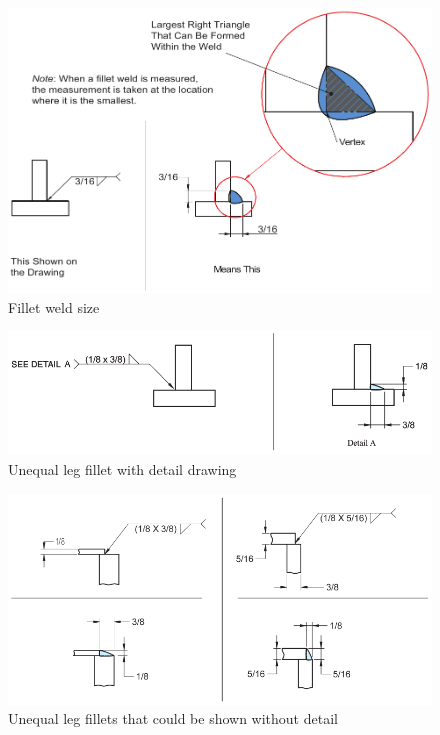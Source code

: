 \begin{figure}[H]
\centering
\includegraphics[width=.99\textwidth]{PIC/CH07/EXAMPLE/FWS}
\caption{Fillet weld size \citep{Corgan2017}}
\end{figure}
\begin{figure}[H]
\centering
\includegraphics{PIC/CH07/EXAMPLE/UL}
\caption{Unequal leg fillet with detail drawing \citep{Corgan2017}}
\end{figure}
\begin{figure}[H]
\centering
\includegraphics{PIC/CH07/EXAMPLE/UL2}
\caption{Unequal leg fillets that could be shown without detail \citep{Corgan2017}}
\end{figure}
